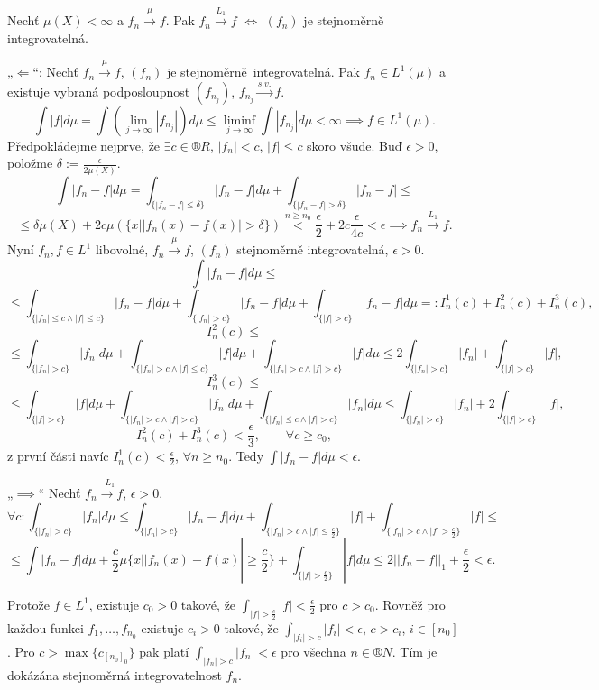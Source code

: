 \documentclass[12pt]{article}					%
\begin{document}
\begin{veta}
	Nechť $\mu(X) < ∞$ a $f_n \overset{\mu}{\rightarrow} f$. Pak $f_n \overset{L_1}{\rightarrow} f$ $\Leftrightarrow$ $(f_n)$ je stejnoměrně integrovatelná.

	\begin{dukazin}
		„$\Leftarrow$“: Nechť $f_n \overset{\mu}{\rightarrow} f$, $(f_n)$ je stejnoměrně integrovatelná. Pak $f_n \in L^1(\mu)$ a existuje vybraná podposloupnost $(f_{n_j})$, $f_{n_j} \overset{s. v.}{\rightarrow} f$.
		$$ \int |f| d\mu = \int(\lim_{j \rightarrow ∞} |f_{n_j}|)d \mu ≤ \liminf_{j \rightarrow ∞} \int |f_{n_j}| d\mu < ∞ \implies f \in L^1(\mu). $$
		Předpokládejme nejprve, že $\exists c \in ®R$, $|f_n| < c$, $|f| ≤ c$ skoro všude. Buď $\epsilon > 0$, položme $\delta := \frac{\epsilon}{2 \mu(X)}$.
		$$ \int |f_n - f| d\mu = \int_{\{|f_n - f| ≤ \delta\}} |f_n - f| d\mu + \int_{\{|f_n - f| > \delta\}} |f_n - f| ≤ $$
		$$ ≤ \delta \mu(X) + 2c \mu(\{x | |f_n(x) - f(x)| > \delta\}) \overset{n ≥ n_0}{<} \frac{\epsilon}{2} + 2c\frac{\epsilon}{4c} < \epsilon \implies f_n \overset{L_1}{\rightarrow} f. $$
		Nyní $f_n, f \in L^1$ libovolné, $f_n \overset{\mu}{\rightarrow} f$, $(f_n)$ stejnoměrně integrovatelná, $\epsilon > 0$.
		$$ \int |f_n - f| d\mu ≤ $$
		$$ ≤ \int_{\{|f_n| ≤ c \land |f| ≤ c\}} |f_n - f| d\mu + \int_{\{|f_n| > c\}} |f_n - f| d\mu + \int_{\{|f| > c\}} |f_n - f| d\mu=: I_n^1(c) + I_n^2(c) + I_n^3(c), $$
		$$ I_n^2(c) ≤ $$
		$$ ≤ \int_{\{|f_n| > c\}} |f_n| d\mu + \int_{\{|f_n| > c \land |f| ≤ c\}} |f| d\mu + \int_{\{|f_n| > c \land |f| > c\}} |f| d\mu ≤ 2 \int_{\{|f_n| > c\}} |f_n| + \int_{\{|f| > c\}} |f|, $$
		$$ I_n^3(c) ≤ $$
		$$ ≤ \int_{\{|f| > c\}} |f| d\mu + \int_{\{|f_n| > c \land |f| > c\}} |f_n| d\mu + \int_{\{|f_n| ≤ c \land |f| > c\}} |f_n| d\mu ≤ \int_{\{|f_n| > c\}} |f_n| + 2\int_{\{|f| > c\}} |f|, $$
		$$ I_n^2(c) + I_n^3(c) < \frac{\epsilon}{3}, \qquad \forall c ≥ c_0, $$
		z první části navíc $I_n^1(c) < \frac{\epsilon}{2}$, $\forall n ≥ n_0$. Tedy $\int |f_n - f| d\mu < \epsilon$.

		„$\implies$“ Nechť $f_n \overset{L_1}{\rightarrow f}$, $\epsilon >0$.
		$$ \forall c: \int_{\{|f_n| > c\}} |f_n| d\mu ≤ \int_{\{|f_n| > c\}} |f_n - f|d\mu + \int_{\{|f_n| > c \land |f| ≤ \frac{c}{2}\}} |f| + \int_{\{|f_n| > c \land |f| > \frac{c}{2}\}} |f| ≤ $$
		$$ ≤ \int |f_n - f|d\mu + \frac{c}{2} \mu \{x | |f_n(x) - f(x)| ≥ \frac{c}{2}\} + \int_{\{|f| > \frac{c}{2}\}} |f| d\mu ≤ 2||f_n - f||_1 + \frac{\epsilon}{2} < \epsilon. $$

		Protože $f \in L^1$, existuje $c_0>0$ takové, že $\int_{|f|>\frac{c}{2}} |f| < \frac{\epsilon}{2}$ pro $c > c_0$. Rovněž pro každou funkci $f_1, …, f_{n_0}$ existuje $c_i > 0$ takové, že $\int_{|f_i| > c} |f_i| < \epsilon$, $c > c_i$, $i \in [n_0]$. Pro $c > \max\{c_{[n_0]_0}\}$ pak platí $\int_{|f_n| > c} |f_n| < \epsilon$ pro všechna $n \in ®N$. Tím je dokázána stejnoměrná integrovatelnost $f_n$.
	\end{dukazin}
\end{veta}
\end{document}
